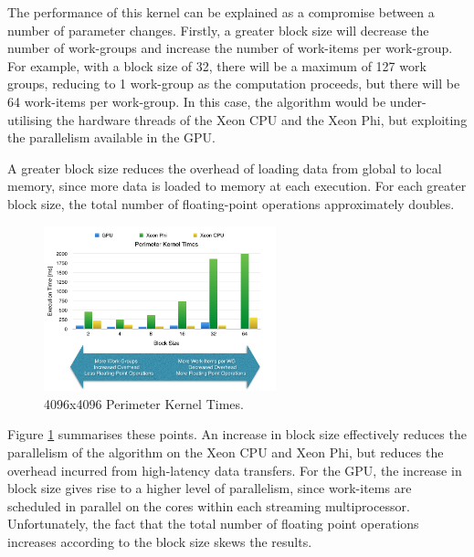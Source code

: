 \par{The performance of this kernel can be explained as a compromise between a number of parameter changes. 
    Firstly, a greater block size will decrease the number of work-groups and increase the number of work-items per work-group. 
    For example, with a block size of 32, there will be a maximum of 127 work groups, 
    reducing to 1 work-group as the computation proceeds, but there will be 64 work-items per work-group. 
    In this case, the algorithm would be under-utilising the hardware threads of the Xeon CPU and the Xeon Phi, 
    but exploiting the parallelism available in the GPU.}

\par{A greater block size reduces the overhead of loading data from global to local memory, 
    since more data is loaded to memory at each execution. For each greater block size, 
    the total number of floating-point operations approximately doubles.}

\begin{figure}[!h]
    \centering
    \includegraphics[width=0.6\textwidth]{figures/PerimeterKernel1.png}
    \caption{4096x4096 Perimeter Kernel Times.}
    \label{PerimeterKernel1}
\end{figure}

\par{Figure \ref{PerimeterKernel1} summarises these points. An increase in block size effectively 
    reduces the parallelism of the algorithm on the Xeon CPU and Xeon Phi, but reduces 
    the overhead incurred from high-latency data transfers. For the GPU, the increase 
    in block size gives rise to a higher level of parallelism, since work-items are scheduled 
    in parallel on the cores within each streaming multiprocessor. Unfortunately, the fact that the 
    total number of floating point operations increases according to the block size skews the results.}

